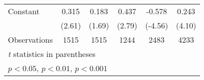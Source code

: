 {\begin{tabular}{l*{5}{c}}
\addlinespace
Constant        &    0.315\sym{*}  &    0.183         &    0.437\sym{**} &   -0.578\sym{***}&    0.243\sym{***}\\
                &   (2.61)         &   (1.69)         &   (2.79)         &  (-4.56)         &   (4.10)         \\
\midrule
Observations    &     1515         &     1515         &     1244         &     2483         &     4233         \\
\bottomrule
\multicolumn{6}{l}{\footnotesize \textit{t} statistics in parentheses}\\
\multicolumn{6}{l}{\footnotesize \sym{*} \(p<0.05\), \sym{**} \(p<0.01\), \sym{***} \(p<0.001\)}\\
\end{tabular}
}
